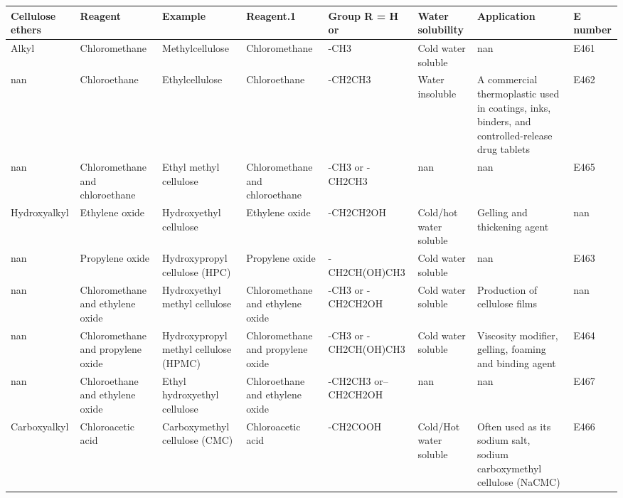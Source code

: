 \documentclass{article}
\begin{document}
\begin{tabular}{llllllll}
\toprule
Cellulose ethers & Reagent & Example & Reagent.1 & Group R = H or & Water solubility & Application & E number \\
\midrule
Alkyl & Chloromethane & Methylcellulose & Chloromethane & -CH3 & Cold water soluble & nan & E461 \\
nan & Chloroethane & Ethylcellulose & Chloroethane & -CH2CH3 & Water insoluble & A commercial thermoplastic used in coatings, inks, binders, and controlled-release drug tablets & E462 \\
nan & Chloromethane and chloroethane & Ethyl methyl cellulose & Chloromethane and chloroethane & -CH3 or -CH2CH3 & nan & nan & E465 \\
Hydroxyalkyl & Ethylene oxide & Hydroxyethyl cellulose & Ethylene oxide & -CH2CH2OH & Cold/hot water soluble & Gelling and thickening agent & nan \\
nan & Propylene oxide & Hydroxypropyl cellulose (HPC) & Propylene oxide & -CH2CH(OH)CH3 & Cold water soluble & nan & E463 \\
nan & Chloromethane and ethylene oxide & Hydroxyethyl methyl cellulose & Chloromethane and ethylene oxide & -CH3 or -CH2CH2OH & Cold water soluble & Production of cellulose films & nan \\
nan & Chloromethane and propylene oxide & Hydroxypropyl methyl cellulose (HPMC) & Chloromethane and propylene oxide & -CH3 or -CH2CH(OH)CH3 & Cold water soluble & Viscosity modifier, gelling, foaming and binding agent & E464 \\
nan & Chloroethane and ethylene oxide & Ethyl hydroxyethyl cellulose & Chloroethane and ethylene oxide & -CH2CH3 or--CH2CH2OH & nan & nan & E467 \\
Carboxyalkyl & Chloroacetic acid & Carboxymethyl cellulose (CMC) & Chloroacetic acid & -CH2COOH & Cold/Hot water soluble & Often used as its sodium salt, sodium carboxymethyl cellulose (NaCMC) & E466 \\
\bottomrule
\end{tabular}
\end{document}
